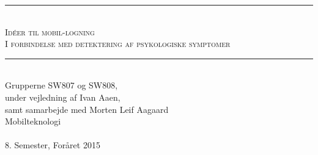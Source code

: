 
\setcounter{secnumdepth}{1}


\begin{titlepage}

\begin{center}
\newcommand{\HRule}{\rule{\linewidth}{0.5mm}}
\HRule \\[0.4cm]
\textsc{ \Huge Idéer til mobil-logning \\[0.2cm]
\large I forbindelse med detektering af psykologiske symptomer}\\[0.4cm]

\HRule \\[1cm]

{\Large Grupperne SW807 og SW808,\\
under vejledning af Ivan Aaen,\\
samt samarbejde med Morten Leif Aagaard} \\[2cm]

\vfill
{\Large Mobilteknologi}
\\ ~\\
{\large 8. Semester, Foråret 2015}

\end{center}
\end{titlepage}


\newpage

\newpage

\newpage

\newpage

\newpage

\newpage

\newpage

\newpage

\newpage

\newpage

\newpage

\newpage


\newpage


